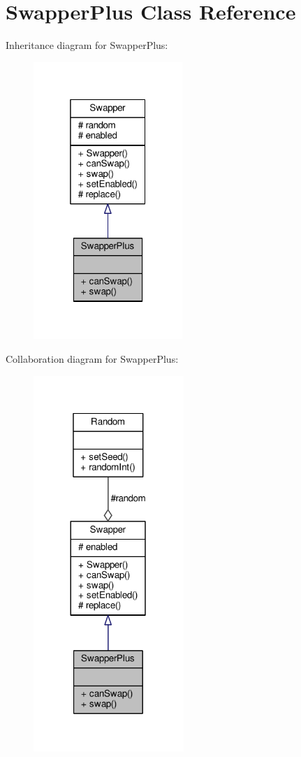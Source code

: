 \hypertarget{classSwapperPlus}{}\section{Swapper\+Plus Class Reference}
\label{classSwapperPlus}


Inheritance diagram for Swapper\+Plus\+:
\nopagebreak
\begin{figure}[H]
\begin{center}
\leavevmode
\includegraphics[width=160pt]{classSwapperPlus__inherit__graph}
\end{center}
\end{figure}


Collaboration diagram for Swapper\+Plus\+:
\nopagebreak
\begin{figure}[H]
\begin{center}
\leavevmode
\includegraphics[width=161pt]{classSwapperPlus__coll__graph}
\end{center}
\end{figure}
